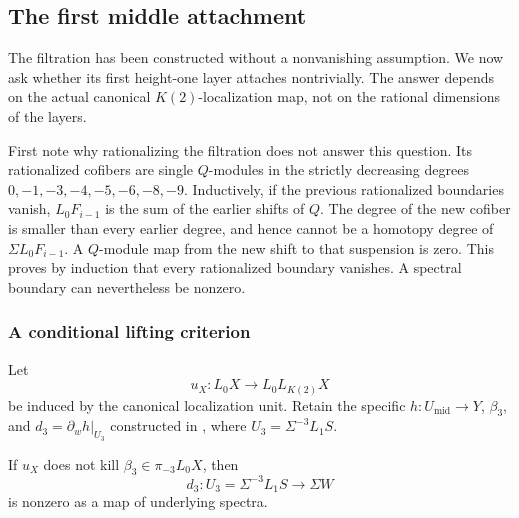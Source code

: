 \subsection{The first middle attachment}\label{sec:attachment}

The filtration has been constructed without a nonvanishing
assumption.  We now ask whether its first height-one layer attaches
nontrivially.  The answer depends on the actual canonical
\(K(2)\)-localization map, not on the rational dimensions of
the layers.

First note why rationalizing the filtration does not answer this
question.  Its rationalized cofibers are single \(Q\)-modules
in the strictly decreasing degrees
\(0,-1,-3,-4,-5,-6,-8,-9\).
Inductively, if the previous rationalized boundaries vanish,
\(L_0F_{i-1}\) is the sum of the earlier shifts of \(Q\).
The degree of the new cofiber is smaller than every earlier
degree, and hence cannot be a homotopy degree of
\(\Sigma L_0F_{i-1}\).  A \(Q\)-module map from the new shift
to that suspension is zero.  This proves by induction that
every rationalized boundary vanishes.  A spectral boundary can
nevertheless be nonzero.

\subsubsection{A conditional lifting criterion}

Let
\[
 u_X:L_0X\longrightarrow L_0L_{K(2)}X
\]
be induced by the canonical localization unit.  Retain the
specific \(h:U_{\mathrm{mid}}\to Y\), \(\beta_3\), and
\(d_3=\partial_wh|_{U_3}\) constructed in
, where \(U_3=\Sigma^{-3}L_1S\).

\begin{proposition}\label{prop:attachment-criterion}
If \(u_X\) does not kill
\(\beta_3\in\pi_{-3}L_0X\), then
\[
 d_3:U_3=\Sigma^{-3}L_1S\longrightarrow\Sigma W
\]
is nonzero as a map of underlying spectra.
\end{proposition}

